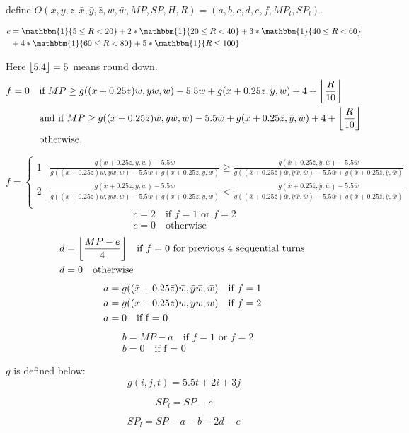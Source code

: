 \documentclass[12pt]{article}
\DeclarePairedDelimiter\floor{\lfloor}{\rfloor}
\begin{document}
define $O(x,y,z,\bar{x},\bar{y},\bar{z},w,\bar{w},MP,SP,H,R) = (a,b,c,d,e,f,MP_l,SP_l)$.

\begin{align*}
e &= \mathbbm{1}\{5 \leq R <20\}	+2* \mathbbm{1}\{20 \leq R <40\} +	3*\mathbbm{1}\{40 \leq R <60\}\\
&+ 4*\mathbbm{1}\{60 \leq R <80\}	+ 5*\mathbbm{1}\{R \leq 100\} 
\end{align*}

Here $\floor*{5.4} = 5$ means round down.
\begin{align*}
	f = 0 \quad &\text{if $MP \geq g((x+0.25z)w,yw,w) - 5.5w + g(x+0.25z,y,w)+4 + \floor*{\frac{R}{10}}$}\quad \\ &\text{and if $MP \geq g((\bar{x}+0.25\bar{z})\bar{w},\bar{y}\bar{w},\bar{w}) - 5.5\bar{w} + g(\bar{x}+0.25\bar{z},\bar{y},\bar{w})+4 + \floor*{\frac{R}{10}}$}\\ &\text{otherwise,}
\end{align*}

\begin{equation*}
  f =
    \begin{cases}
      1 & \frac{g(x+0.25z,y,w)-5.5w}{g((x+0.25z)w,yw,w) - 5.5w + g(x+0.25z,y,w)} \geq \frac{g(\bar{x}+0.25\bar{z},\bar{y},\bar{w})-5.5\bar{w}}{g((\bar{x}+0.25\bar{z})\bar{w},\bar{y}\bar{w},\bar{w}) - 5.5\bar{w} + g(\bar{x}+0.25\bar{z},\bar{y},\bar{w})}  \\
      2 & \frac{g(x+0.25z,y,w)-5.5w}{g((x+0.25z)w,yw,w) - 5.5w + g(x+0.25z,y,w)} < \frac{g(\bar{x}+0.25\bar{z},\bar{y},\bar{w})-5.5\bar{w}}{g((\bar{x}+0.25\bar{z})\bar{w},\bar{y}\bar{w},\bar{w}) - 5.5\bar{w} + g(\bar{x}+0.25\bar{z},\bar{y},\bar{w})}  \\
    \end{cases}       
\end{equation*}
\begin{align*}
& c = 2 \quad \text{if $f = 1$ or $f=2$ }\\
&c=0 \quad\text{otherwise}	
\end{align*}
 \begin{align*}
& d = \floor*{\frac{MP-e}{4}} \quad \text{if $f = 0$ for previous $4$ sequential turns }\\
&d=0 \quad\text{otherwise}	
\end{align*}
\begin{align*}
& a = g((\bar{x}+0.25\bar{z})\bar{w},\bar{y}\bar{w},\bar{w}) \quad \text{if $f = 1$}\\
& a = g((x+0.25z)w,yw,w) \quad \text{if $ f = 2$ }\\
&a=0 \quad\text{if f = 0}	
\end{align*}
 \begin{align*}
& b = MP-a \quad \text{if $f = 1$ or $f = 2$}\\
&b=0 \quad\text{if f = 0}	
\end{align*}

$g$ is defined below:
\begin{equation*}
g(i,j,t) =5.5t +2i+3j  	
\end{equation*}

\begin{equation*}
SP_l = SP - c	
\end{equation*}

\begin{equation*}
SP_l = SP - a -b - 2d -e	
\end{equation*}
\end{document}

